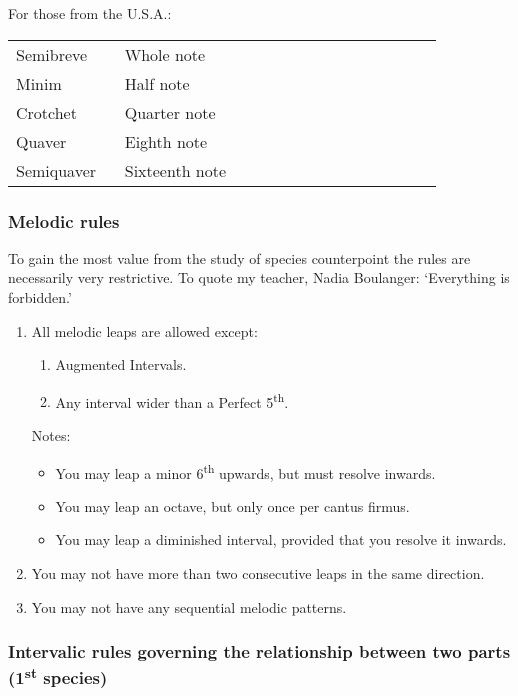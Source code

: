 \documentclass{article}
\begin{document}
For those from the U.S.A.:\\

\begin{tabular}{p{0.2\linewidth}p{0.65\linewidth}}
    Semibreve & Whole note\\
    Minim & Half note\\
    Crotchet & Quarter note\\
    Quaver & Eighth note\\
    Semiquaver & Sixteenth note\\
\end{tabular}

\subsubsection{Melodic rules}
To gain the most value from the study of species counterpoint the rules are necessarily very restrictive.
To quote my teacher, Nadia Boulanger: `Everything is forbidden.'

\begin{enumerate}
    \item All melodic leaps are allowed except:
        \begin{enumerate}
            \item Augmented Intervals.
            \item Any interval wider than a Perfect 5\textsuperscript{th}.
        \end{enumerate}
        Notes:
        \begin{itemize}
            \item You may leap a minor 6\textsuperscript{th} upwards, but must resolve inwards.
            \item You may leap an octave, but only once per cantus firmus.
            \item You may leap a diminished interval, provided that you resolve it inwards.
        \end{itemize}
    \item You may not have more than two consecutive leaps in the same direction.
    \item You may not have any sequential melodic patterns.
\end{enumerate}

\subsubsection{Intervalic rules governing the relationship between two parts (1\textsuperscript{st} species)}
\end{document}
